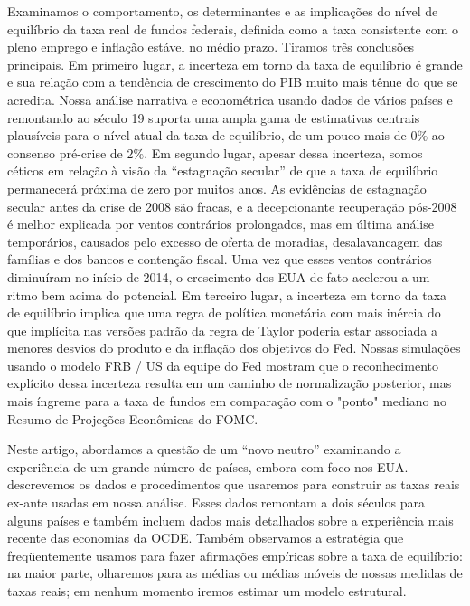 Examinamos o comportamento, os determinantes e as implicações do nível de equilíbrio da taxa real de fundos federais, definida como a taxa consistente com o pleno emprego e inflação estável no médio
prazo. Tiramos três conclusões principais. Em primeiro lugar, a incerteza em torno da taxa de equilíbrio é grande e sua relação com a tendência de crescimento do PIB muito mais tênue do que se acredita. Nossa análise narrativa e econométrica usando dados de vários países e remontando ao século 19 suporta uma ampla gama de estimativas centrais plausíveis para o nível atual da taxa de equilíbrio, de um pouco mais de $0\%$ ao consenso pré-crise de $2\%$. Em segundo lugar, apesar dessa incerteza, somos céticos em relação à visão da “estagnação secular” de que a taxa de equilíbrio permanecerá próxima de zero por muitos anos. As evidências de estagnação secular antes da crise de 2008 são fracas, e a decepcionante recuperação pós-2008 é melhor explicada por ventos contrários prolongados, mas em última análise temporários, causados pelo excesso de oferta de moradias, desalavancagem das famílias e dos bancos e contenção fiscal. Uma vez que esses ventos contrários diminuíram no início de 2014, o crescimento dos EUA de fato acelerou a um ritmo bem acima do potencial. Em terceiro lugar, a incerteza em torno da taxa de equilíbrio implica que uma regra de política monetária com mais inércia do que implícita nas versões padrão da regra de Taylor poderia estar associada a menores desvios do produto e da inflação dos objetivos do Fed. Nossas simulações usando o modelo FRB / US da equipe do Fed mostram que o reconhecimento explícito dessa incerteza resulta em um caminho de normalização posterior, mas mais íngreme para a taxa de fundos em comparação com o "ponto" mediano no Resumo de Projeções Econômicas do FOMC.

Neste artigo, abordamos a questão de um “novo neutro” examinando a experiência de um grande número de países, embora com foco nos EUA. descrevemos os dados e procedimentos que usaremos para construir as taxas reais ex-ante usadas em nossa análise. Esses dados remontam a dois séculos para alguns países e também incluem dados mais detalhados sobre a experiência mais recente das economias da OCDE. Também observamos a estratégia que freqüentemente usamos para fazer afirmações empíricas sobre a taxa de equilíbrio: na maior parte, olharemos para as médias ou médias móveis de nossas medidas de taxas reais; em nenhum momento iremos estimar um modelo estrutural.

